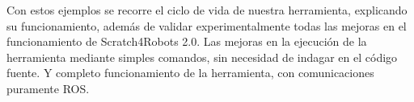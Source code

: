 Con estos ejemplos se recorre el ciclo de vida de nuestra herramienta, explicando su funcionamiento, además de validar experimentalmente todas las mejoras en el funcionamiento de Scratch4Robots 2.0. Las mejoras en la ejecución de la herramienta mediante simples comandos, sin necesidad de indagar en el código fuente. Y completo funcionamiento de la herramienta, con comunicaciones puramente ROS. 

